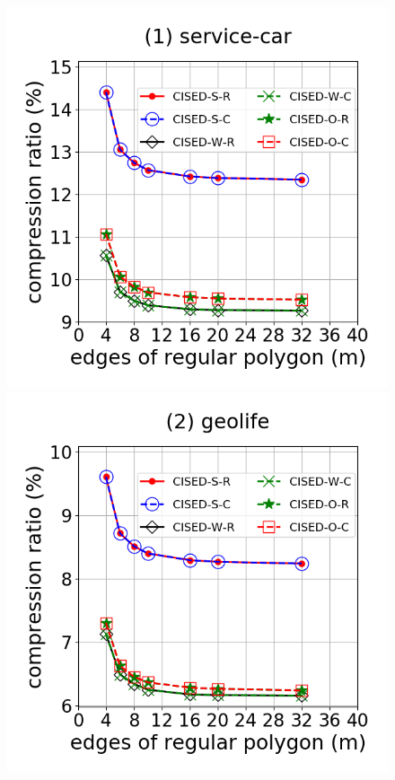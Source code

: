 \begin{figure}[tb!]
\centering
\includegraphics[scale = 0.28]{Figures/Exp-M-e-60-CR-service.png}
\includegraphics[scale = 0.28]{Figures/Exp-M-e-60-CR-geolife.png}

\end{figure}
